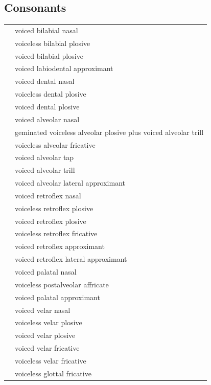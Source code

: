 \documentclass{article}
\begin{document}
\subsection{Consonants}

\begin{xltabular}{\textwidth}{lL}
   & voiced bilabial nasal \\
   & voiceless bilabial plosive \\
   & voiced bilabial plosive \\
   & voiced labiodental approximant \\
   & voiced dental nasal \\
   & voiceless dental plosive \\
   & voiced dental plosive \\
   & voiced alveolar nasal \\
   & geminated voiceless alveolar plosive plus voiced alveolar trill \\
   & voiceless alveolar fricative \\
   & voiced alveolar tap \\
   & voiced alveolar trill \\
   & voiced alveolar lateral approximant \\
   & voiced retroflex nasal \\
   & voiceless retroflex plosive \\
   & voiced retroflex plosive \\
   & voiceless retroflex fricative \\
   & voiced retroflex approximant \\
   & voiced retroflex lateral approximant \\
  \ipa{\textltailn} & voiced palatal nasal \\
  \ipa{\t{\textteshlig}} & voiceless postalveolar affricate \\
   & voiced palatal approximant \\
   & voiced velar nasal \\
   & voiceless velar plosive \\
   & voiced velar plosive \\
   & voiced velar fricative \\
   & voiceless velar fricative \\
   & voiceless glottal fricative \\
\end{xltabular}
\end{document}
